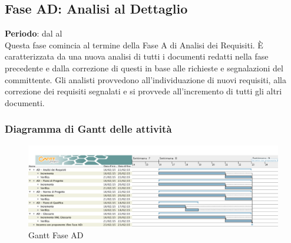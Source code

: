 \subsection{Fase AD: Analisi al Dettaglio}
\textbf{Periodo}: dal  al  \\
Questa fase comincia al termine della Fase A di Analisi dei Requisiti. È caratterizzata da una nuova analisi di tutti i documenti redatti nella fase precedente e dalla correzione di questi in base alle richieste e segnalazioni del committente. Gli analisti provvedono all'individuazione di nuovi requisiti, alla correzione dei requisiti segnalati e si provvede all'incremento di tutti gli altri documenti.
\subsubsection{Diagramma di Gantt delle attività}
\begin{center}
	\begin{figure}[H]\centering
		\includegraphics[width=\textwidth]{PianoDiProgetto/Pics/FaseAD.png}
		\caption{Gantt Fase AD}
	\end{figure}
\end{center}